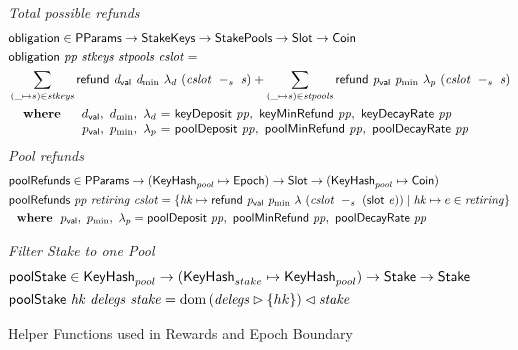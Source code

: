 \begin{figure}[htb]
  \emph{Total possible refunds}
  \begin{align*}
      & \fun{obligation} \in \PParams \to \StakeKeys \to \StakePools \to \Slot \to \Coin \\
      & \obligation{pp}{stkeys}{stpools}{cslot} =\\
      & \sum\limits_{(\_ \mapsto s) \in \var{stkeys}}
        \refund{d_{\mathsf{val}}}{d_{\min}}{\lambda_d}{(\slotminus{cslot}{s})}
        + \sum\limits_{(\_ \mapsto s) \in \var{stpools}}
        \refund{p_{\mathsf{val}}}{p_{\min}}{\lambda_p}{(\slotminus{cslot}{s})} \\
      &
      \begin{array}{lr@{~=~}l}
        \where
          & \dval,~d_{\min},~\lambda_d
          & \fun{keyDeposit}~\var{pp},~\fun{keyMinRefund}~\var{pp},~\fun{keyDecayRate}~\var{pp}
          \\
          & p_{\mathsf{val}},~p_{\min},~\lambda_p
          & \fun{poolDeposit}~\var{pp},~\fun{poolMinRefund}~\var{pp},~\fun{poolDecayRate}~\var{pp}
      \end{array}\\
  \end{align*}
  \emph{Pool refunds}
  \begin{align*}
      & \mathsf{poolRefunds} \in \mathsf{PParams} \to (\mathsf{KeyHash}_{pool} \mapsto \mathsf{Epoch}) \to \mathsf{Slot} \to
      (\mathsf{KeyHash}_{pool} \mapsto \mathsf{Coin}) \\
      & \mathsf{poolRefunds}~ \mathit{pp}~ \mathit{retiring}~ \mathit{cslot} = \left\{
        \mathit{hk}\mapsto
          \mathsf{refund}~ \mathit{p_{\mathsf{val}}}~ \mathit{p_{\min}}~ {\lambda}~ {(\mathit{cslot}~-_{s}~\mathit{(\mathsf{slot}~e)})}
          \mid
          \mathit{hk}\mapsto e\in\mathit{retiring}
        \right\}\\
      & ~ ~ \mathbf{where}~ ~  p_{\mathsf{val}},~p_{\min},~\lambda_p =
          \mathsf{poolDeposit}~\mathit{pp},~\mathsf{poolMinRefund}~\mathit{pp},~\mathsf{poolDecayRate}~\mathit{pp} \\
  \end{align*}

  \emph{Filter Stake to one Pool}
  \begin{align*}
      & \mathsf{poolStake} \in \mathsf{KeyHash}_{pool} \to (\mathsf{KeyHash}_{stake} \mapsto \mathsf{KeyHash}_{pool})
        \to \mathsf{Stake} \to \mathsf{Stake} \\
      & \mathsf{poolStake}~ \mathit{hk}~ \mathit{delegs}~ \mathit{stake} =
        \operatorname{dom}{(\mathit{delegs}\rhd\{hk\})\lhd\mathit{stake}}
  \end{align*}

  \caption{Helper Functions used in Rewards and Epoch Boundary}
  \label{fig:funcs:epoch-helper-rewards}
\end{figure}


